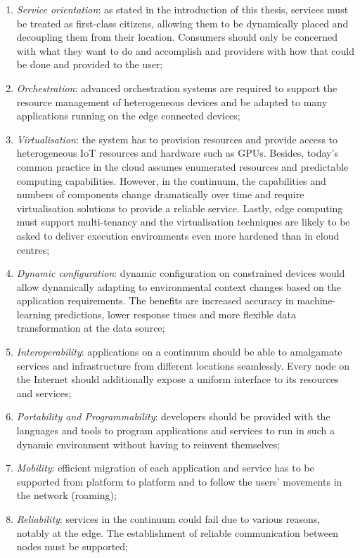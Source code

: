 \begin{enumerate}
    \item \emph{Service orientation}: as stated in the introduction of this thesis, services must be treated as first-class citizens, allowing them to be dynamically placed and decoupling them from their location. Consumers should only be concerned with what they want to do and accomplish and providers with how that could be done and provided to the user;
    \item \emph{Orchestration}: advanced orchestration systems are required to support the resource management of heterogeneous devices and be adapted to many applications running on the edge connected devices;
    \item \emph{Virtualisation}: the system has to provision resources and provide access to heterogeneous IoT resources and hardware such as GPUs. Besides, today's common practice in the cloud assumes enumerated resources and predictable computing capabilities. However, in the continuum, the capabilities and numbers of components change dramatically over time and require virtualisation solutions to provide a reliable service. Lastly, edge computing must support multi-tenancy and the virtualisation techniques are likely to be asked to deliver execution environments even more hardened than in cloud centres;
    \item \emph{Dynamic configuration}: dynamic configuration on constrained devices would allow dynamically adapting to environmental context changes based on the application requirements. The benefits are increased accuracy in machine-learning predictions, lower response times and more flexible data transformation at the data source;
    \item \emph{Interoperability}: applications on a continuum should be able to amalgamate services and infrastructure from different locations seamlessly. Every node on the Internet should additionally expose a uniform interface to its resources and services;
    \item \emph{Portability and Programmability}: developers should be provided with the languages and tools to program applications and services to run in such a dynamic environment without having to reinvent themselves;
    \item \emph{Mobility}: efficient migration of each application and service has to be supported from platform to platform and to follow the users' movements in the network (roaming);
    \item \emph{Reliability}: services in the continuum could fail due to various reasons, notably at the edge. The establishment of reliable communication between nodes must be supported;

\end{enumerate}
